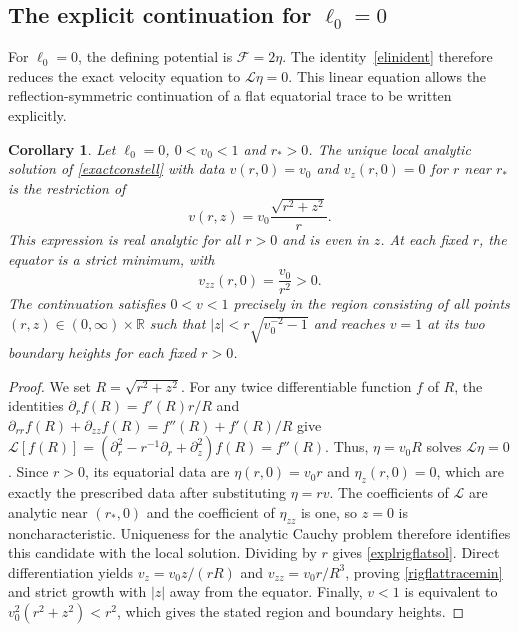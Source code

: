 \documentclass[amsmath,amsfonts,amssymb,aps,pra,superscriptaddress,10pt]{revtex4-2}
\numberwithin{equation}{section}
\theoremstyle{plain}
\newtheorem{corollary}{Corollary}
\theoremstyle{definition}
\theoremstyle{remark}
\theoremstyle{definition}
\newcommand{\ellzero}{\ell_0}
\begin{document}
\subsection{The explicit continuation for \texorpdfstring{$\ellzero=0$}{ell0=0}}

For $\ellzero=0$, the defining potential is $\mathcal{F}=2\eta$. The identity~\eqref{elinident} therefore reduces the exact velocity equation to $\mathcal{L}\eta=0$. This linear equation allows the reflection-symmetric continuation of a flat equatorial trace to be written explicitly.

\begin{corollary}
Let $\ellzero=0$, $0<v_0<1$ and $r_*>0$. The unique local analytic solution of \eqref{exactconstell} with data $v(r,0)=v_0$ and $v_z(r,0)=0$ for $r$ near $r_*$ is the restriction of
\begin{equation}\label{explrigflatsol}
v(r,z)=v_0\frac{\sqrt{r^2+z^2}}{r}.
\end{equation}
This expression is real analytic for all $r>0$ and is even in $z$. At each fixed $r$, the equator is a strict minimum, with
\begin{equation}\label{rigflattracemin}
v_{zz}(r,0)=\frac{v_0}{r^2}>0.
\end{equation}
The continuation satisfies $0<v<1$ precisely in the region consisting of all points $(r,z)\in(0,\infty)\times\mathbb{R}$ such that $|z|<r\sqrt{v_0^{-2}-1}$ and reaches $v=1$ at its two boundary heights for each fixed $r>0$.
\end{corollary}

\begin{proof}
We set $R=\sqrt{r^2+z^2}$. For any twice differentiable function $f$ of $R$, the identities $\partial_r f(R)=f'(R)r/R$ and $\partial_{rr}f(R)+\partial_{zz}f(R)=f''(R)+f'(R)/R$ give $\mathcal{L}[f(R)]=\left(\partial_r^2-r^{-1}\partial_r+\partial_z^2\right)f(R)
=f''(R)$. Thus, $\eta=v_0 R$ solves $\mathcal{L}\eta=0$. Since $r>0$, its equatorial data are $\eta(r,0)=v_0r$ and $\eta_z(r,0)=0$, which are exactly the prescribed data after substituting $\eta=rv$. The coefficients of $\mathcal{L}$ are analytic near $(r_*,0)$ and the coefficient of $\eta_{zz}$ is one, so $z=0$ is noncharacteristic. Uniqueness for the analytic Cauchy problem therefore identifies this candidate with the local solution. Dividing by $r$ gives \eqref{explrigflatsol}. Direct differentiation yields $v_z=v_0z/(rR)$ and $v_{zz}=v_0r/R^3$, proving \eqref{rigflattracemin} and strict growth with $|z|$ away from the equator. Finally, $v<1$ is equivalent to $v_0^2(r^2+z^2)<r^2$, which gives the stated region and boundary heights.
\end{proof}
\end{document}

